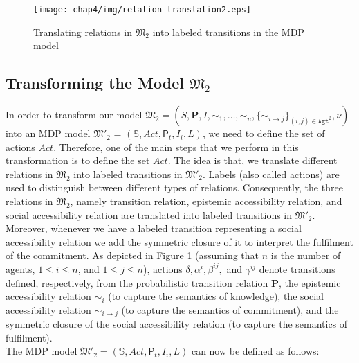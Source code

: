 \begin{figure}[h]
\centering
\texttt{[image: chap4/img/relation-translation2.eps]}
\caption{Translating relations in $\mathfrak{M_2}$ into labeled transitions in the MDP model} \label{fig:relation-translation-PCTLKC}
\end{figure}

\subsection{Transforming the Model $\mathfrak{M_2}$}

In order to transform our model $\mathfrak{M_2}=(S,\textbf{P},I,\sim_1, \ldots
,\sim_n,\{\sim_{i \rightarrow j}\}_{{(i,j)}\in \texttt{Agt}^2},\nu)$ into an MDP model $\mathfrak{M'_2}$ = $(\mathbb{S}, Act, \textsf{P}_t ,I_i, L)$, we need to define the set of actions $Act$. Therefore, one of the main steps that we perform in this transformation is to define the set $Act$. The idea is that, we translate different relations in $\mathfrak{M_2}$ into labeled transitions in $\mathfrak{M'_2}$. Labels (also called actions) are used to distinguish between different types of relations. Consequently, the three relations in $\mathfrak{M_2}$, namely transition relation, epistemic accessibility relation, and social accessibility relation are translated into labeled transitions in $\mathfrak{M'_2}$. Moreover, whenever we have a labeled transition representing a social accessibility relation we add the symmetric closure of it to interpret the fulfilment of the commitment. As depicted in Figure \ref{fig:relation-translation-PCTLKC} (assuming that $n$ is the number of agents, $1 \leq i \leq n$, and $1 \leq j \leq n$), actions $\delta, \alpha^i, \beta^{ij},$ and $\gamma^{ij}$ denote transitions defined, respectively, from the probabilistic transition relation $\textbf{P}$, the epistemic accessibility relation $\sim_i$ (to capture the semantics of knowledge), the social accessibility relation $\sim_{i \rightarrow j}$ (to capture the semantics of commitment), and the symmetric closure of the social accessibility relation (to capture the semantics of fulfilment).\\

The MDP model $\mathfrak{M'_2} = (\mathbb{S}, Act, \textsf{P}_t ,I_i, L)$ can now be defined as follows:


